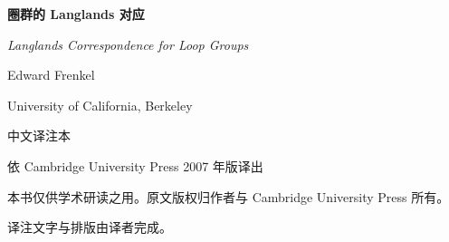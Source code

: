 \begin{titlepage}
    \centering
    \vspace*{2.2cm}

    {\fontsize{30}{38}\selectfont\bfseries 圈群的 Langlands 对应\par}
    \vspace{0.9cm}
    {\Large\itshape Langlands Correspondence for Loop Groups\par}

    \vspace{2.4cm}
    {\large Edward Frenkel\par}
    \vspace{0.35cm}
    {\normalsize University of California, Berkeley\par}

    \vspace{2.6cm}
    {\large 中文译注本\par}
    \vspace{0.3cm}
    {\normalsize 依 Cambridge University Press 2007 年版译出\par}

    \vfill
    {\small 本书仅供学术研读之用。原文版权归作者与 Cambridge University Press 所有。\par
    译注文字与排版由译者完成。\par}
\end{titlepage}
